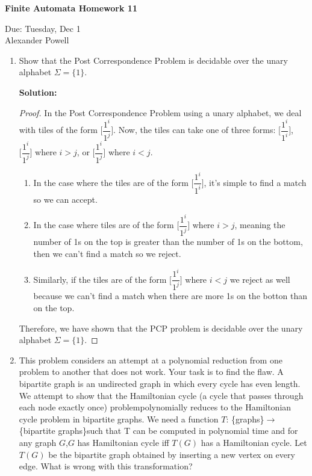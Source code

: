 \documentclass[11pt]{article}
\begin{document}
\begin{center}             %
\begin{LARGE}
{\bf Finite Automata Homework 11}
\end{LARGE}
\vskip 0.25cm      %

Due: Tuesday, Dec 1 \\  %
Alexander Powell
\end{center}

\begin{enumerate}[1]

\item Show that the Post Correspondence Problem is decidable over the unary alphabet $\Sigma = \{ 1 \}$.  

\textbf{Solution: }
\begin{proof}

In the Post Correspondence Problem using a unary alphabet, we deal with tiles of the form  $\Bigg[ \dfrac{1^i}{1^j} \Bigg]$.  Now, the tiles can take one of three forms: $\Bigg[ \dfrac{1^i}{1^i} \Bigg]$, $\Bigg[ \dfrac{1^i}{1^j} \Bigg]$ where $i>j$, or $\Bigg[ \dfrac{1^i}{1^j} \Bigg]$ where $i<j$.  

\begin{enumerate}
\item In the case where the tiles are of the form $\Bigg[ \dfrac{1^i}{1^i} \Bigg]$, it's simple to find a match so we can accept.  

\item In the case where tiles are of the form $\Bigg[ \dfrac{1^i}{1^j} \Bigg]$ where $i>j$, meaning the number of 1s on the top is greater than the number of 1s on the bottom, then we can't find a match so we reject.  

\item Similarly, if the tiles are of the form $\Bigg[ \dfrac{1^i}{1^j} \Bigg]$ where $i<j$ we reject as well because we can't find a match when there are more 1s on the botton than on the top.  
\end{enumerate}

Therefore, we have shown that the PCP problem is decidable over the unary alphabet $\Sigma = \{ 1 \}$.  

\end{proof}

\newpage

\item This problem considers an attempt at a polynomial reduction from one problem to another that does not work. Your task is to find the flaw. A bipartite graph is an undirected graph in which every cycle has even length. We attempt to show that the Hamiltonian cycle (a cycle that passes through each node exactly once) problempolynomially reduces to the Hamiltonian cycle problem in bipartite graphs. We need a function $T$: \{graphs\}$\rightarrow$\{bipartite graphs\}such that T can be computed in polynomial time and for any graph $G$,$G$ has Hamiltonian cycle iff $T(G)$ has a Hamiltonian cycle. Let $T(G)$ be the bipartite graph obtained by inserting a new vertex on every edge. What is wrong with this transformation?


\end{enumerate}
\end{document}
